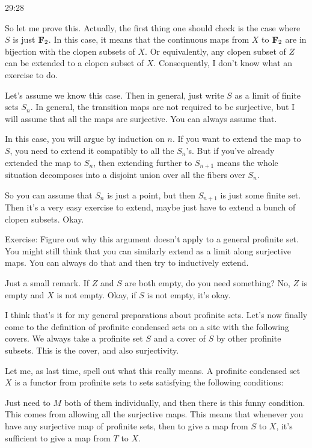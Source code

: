 \begin{example}
\begin{unfinished}{29:28}
\begin{remark}
So let me prove this. 
Actually, the first thing one should check is the case where $S$ is just $\mathbf F_2$. In this case, it means that the continuous maps from $X$ to $\mathbf F_2$ are in bijection with the clopen subsets of $X$. Or equivalently, any clopen subset of $Z$ can be extended to a clopen subset of $X$. Consequently, I don't know what an exercise to do.

Let's assume we know this case. Then in general, just write $S$ as a limit of finite sets $S_n$. In general, the transition maps are not required to be surjective, but I will assume that all the maps are surjective. You can always assume that.

In this case, you will argue by induction on $n$. If you want to extend the map to $S$, you need to extend it compatibly to all the $S_n$'s. But if you've already extended the map to $S_n$, then extending further to $S_{n+1}$ means the whole situation decomposes into a disjoint union over all the fibers over $S_n$.

So you can assume that $S_n$ is just a point, but then $S_{n+1}$ is just some finite set. Then it's a very easy exercise to extend, maybe just have to extend a bunch of clopen subsets. Okay.

Exercise: Figure out why this argument doesn't apply to a general profinite set. You might still think that you can similarly extend as a limit along surjective maps. You can always do that and then try to inductively extend.

\begin{remark}

Just a small remark. If $Z$ and $S$ are both empty, do you need something? No, $Z$ is empty and $X$ is not empty. Okay, if $S$ is not empty, it's okay.

\end{remark}

I think that's it for my general preparations about profinite sets. Let's now finally come to the definition of profinite condensed sets on a site with the following covers. We always take a profinite set $S$ and a cover of $S$ by other profinite subsets. This is the cover, and also surjectivity.

Let me, as last time, spell out what this really means. A profinite condensed set $X$ is a functor from profinite sets to sets satisfying the following conditions:

Just need to $M$ both of them individually, and then there is this funny condition. This comes from allowing all the surjective maps. This means that whenever you have any surjective map of profinite sets, then to give a map from $S$ to $X$, it's sufficient to give a map from $T$ to $X$. 


\end{remark}
\end{unfinished}
\end{example}
